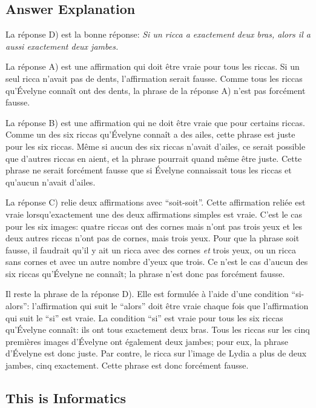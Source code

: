 \documentclass[a4paper,11pt]{report}
\begin{document}
\endgroup

\subsection*{Answer Explanation}

La réponse D) est la bonne réponse: \emph{Si un ricca a exactement deux bras, alors il a aussi exactement deux jambes.}

La réponse A) est une affirmation qui doit être vraie pour tous les riccas. Si un seul ricca n’avait pas de dents, l’affirmation serait fausse. Comme tous les riccas qu’Évelyne connaît ont des dents, la phrase de la réponse A) n’est pas forcément fausse.

La réponse B) est une affirmation qui ne doit être vraie que pour certains riccas. Comme un des six riccas qu’Évelyne connaît a des ailes, cette phrase est juste pour les six riccas. Même si aucun des six riccas n’avait d’ailes, ce serait possible que d’autres riccas en aient, et la phrase pourrait quand même être juste. Cette phrase ne serait forcément fausse que si Évelyne connaissait tous les riccas et qu’aucun n’avait d’ailes.

La réponse C) relie deux affirmations avec “soit-soit”. Cette affirmation reliée est vraie lorsqu’exactement une des deux affirmations simples est vraie. C’est le cas pour les six images: quatre riccas ont des cornes mais n’ont pas trois yeux et les deux autres riccas n’ont pas de cornes, mais trois yeux. Pour que la phrase soit fausse, il faudrait qu’il y ait un ricca avec des cornes \emph{et} trois yeux, ou un ricca sans cornes et avec un autre nombre d’yeux que trois. Ce n’est le cas d’aucun des six riccas qu’Évelyne ne connaît; la phrase n’est donc pas forcément fausse.

Il reste la phrase de la réponse D). Elle est formulée à l’aide d’une condition “si-alors”: l’affirmation qui suit le “alors” doit être vraie chaque fois que l’affirmation qui suit le “si” est vraie. La condition “si” est vraie pour tous les six riccas qu’Évelyne connaît: ils ont tous exactement deux bras. Tous les riccas sur les cinq premières images d’Évelyne ont également deux jambes; pour eux, la phrase d’Évelyne est donc juste. Par contre, le ricca sur l’image de Lydia a plus de deux jambes, cinq exactement. Cette phrase est donc forcément fausse.


\subsection*{This is Informatics}
\end{document}
